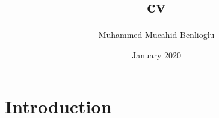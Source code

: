 \documentclass{article}
\title{cv}
\author{Muhammed Mucahid Benlioglu}
\date{January 2020}
\begin{document}
\maketitle

\section{Introduction}
\end{document}
